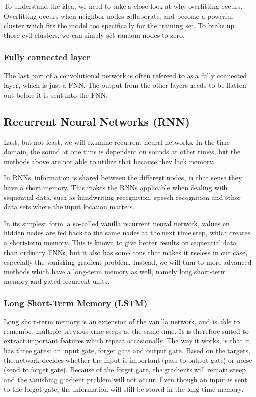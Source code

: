 To understand the idea, we need to take a close look at why overfitting occurs. Overfitting occurs when neighbor nodes collaborate, and become a powerful cluster which fits the model too specifically for the training set. To brake up those evil clusters, we can simply set random nodes to zero. \cite{Dropout}

\subsubsection*{Fully connected layer}
The last part of a convolutional network is often refereed to as a fully connected layer, which is just a FNN. The output from the other layers needs to be flatten out before it is sent into the FNN.

\subsection{Recurrent Neural Networks (RNN)}
Last, but not least, we will examine recurrent neural networks. In the time domain, the sound at one time is dependent on sounds at other times, but the methods above are not able to utilize that because they lack memory. 

In RNNs, information is shared between the different nodes, in that sense they have a short memory. This makes the RNNs applicable when dealing with sequential data, such as handwriting recognition, speech recognition and other data sets where the input location matters. 

In its simplest form, a so-called vanilla recurrent neural network, values on hidden nodes are fed back to the same nodes at the next time step, which creates a short-term memory. This is known to give better results on sequential data than ordinary FNNs, but it also has some cons that makes it useless in our case, especially the vanishing gradient problem. Instead, we will turn to more advanced methods which have a long-term memory as well, namely long short-term memory and gated recurrent units.

\subsubsection*{Long Short-Term Memory (LSTM)}
Long short-term memory is an extension of the vanilla network, and is able to remember multiple previous time steps at the same time. It is therefore suited to extract important features which repeat occasionally. The way it works, is that it has three gates: an input gate, forget gate and output gate. Based on the targets, the network decides whether the input is important (pass to output gate) or noise (send to forget gate). Because of the forget gate, the gradients will remain steep and the vanishing gradient problem will not occur. Even though an input is sent to the forgot gate, the information will still be stored in the long time memory. \cite{lstm}

